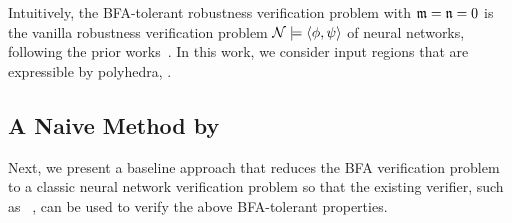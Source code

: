Intuitively, the BFA-tolerant robustness verification problem with $\mathfrak{m}=\mathfrak{n}=0$ is the vanilla robustness verification problem ${\mathcal{N}}\models\langle \phi,\psi\rangle$ of neural networks, following the prior works~\cite{GuyKatz2017ReluplexAE}. 
In this work, we consider input regions that are expressible by polyhedra, . 

\subsection{A Naive Method by \deepPoly}\label{sec:naiveMethod}

Next, we present a baseline approach that reduces the BFA verification problem to a classic neural network verification problem so that the existing verifier, such as \deepPoly~\cite{SGPV19}, can be used to verify the above BFA-tolerant properties.


